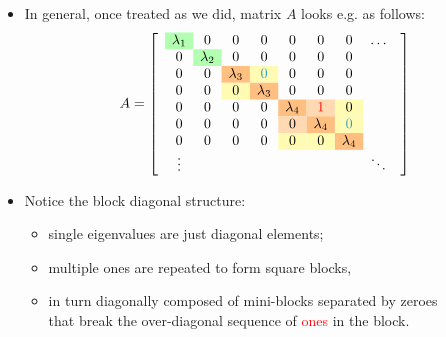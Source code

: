 \begin{frame}
\myPause
 \begin{itemize}[<+-| alert@+>]
 \item In general, once treated as we did, matrix $A$ looks e.g. as follows:
 \begin{displaymath}
  A = 
  \begin{bmatrix}
   \-& \cellcolor{green!30!white}{\lambda_{1}} & 0 & 0 & 0 & 0 & 0 & 0 & \ldots & \\
   \-& 0 &\cellcolor{green!30!white}{\lambda_{2}}  & 0 & 0 & 0 & 0 & 0 \\
   \-& 0 & 0 &\cellcolor{orange!50!white}{\lambda_{3}}
             &\cellcolor{yellow!30!white}{\textcolor{cyan!80!black}{0}} & 0 & 0 & 0 \\
   \-& 0 & 0 &\cellcolor{yellow!30!white}{0}
             &\cellcolor{orange!50!white}{\lambda_{3}} & 0 & 0 & 0 \\
   \-& 0 & 0 & 0 & 0 &\cellcolor{orange!50!white}{\lambda_{4}}
                     &\cellcolor{orange!30!white}{\textcolor{red}{1}} & \cellcolor{yellow!30!white}{0} \\
   \-& 0 & 0 & 0 & 0 &\cellcolor{orange!30!white}{0}
                     &\cellcolor{orange!50!white}{\lambda_{4}}
                     & \cellcolor{yellow!30!white}{\textcolor{cyan!80!black}{0}} \\
   \-& 0 & 0 & 0 & 0 &\cellcolor{yellow!30!white}{0}
                     &\cellcolor{yellow!30!white}{0} & \cellcolor{orange!50!white}{\lambda_{4}} \\
   \-& \vdots &&&&&&& \ddots \\
  \end{bmatrix}
 \end{displaymath}
 \item Notice the block diagonal structure:
       \begin{itemize}[<+-| alert@+>]
       \item \colorbox{green!30!white}{single} eigenvalues are just diagonal elements;
       \item \colorbox{orange!50!white}{multiple} ones are repeated to form square \colorbox{yellow!30!white}{blocks},
       \item in turn diagonally composed of \colorbox{orange!30!white}{mini-blocks} separated by
             \textcolor{cyan!80!black}{zeroes}\\
             that break the over-diagonal sequence of \textcolor{red}{ones} in the block.
       \end{itemize}
 \end{itemize}
\end{frame}

